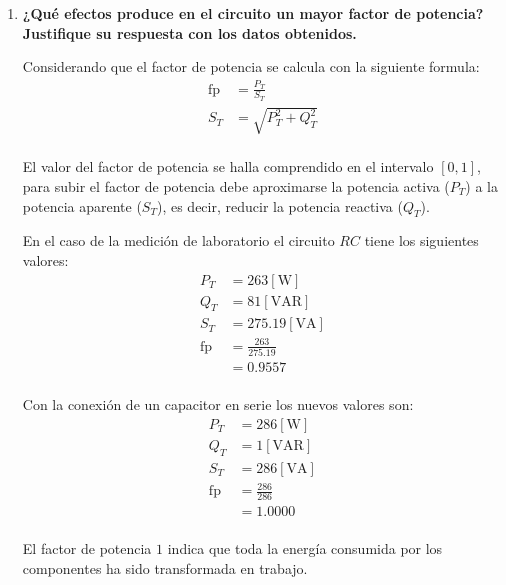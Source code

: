 \documentclass[letter,11pt]{article}
\begin{document}
\begin{enumerate}

\item \textbf{¿Qué efectos produce en el circuito un mayor factor de potencia?
Justifique su respuesta con los datos obtenidos.}

Considerando que el factor de potencia se calcula con la siguiente formula:
\begin{equation*}
    \begin{split}
        \text{fp} &= \frac{P_T}{S_T}\\
        S_T &= \sqrt{P_T^2 + Q_T^2}\\
    \end{split}
\end{equation*}

El valor del factor de potencia se halla comprendido en el intervalo $[0,1]$,
para subir el factor de potencia debe aproximarse la potencia activa ($P_T$) a
la potencia aparente ($S_T$), es decir, reducir la potencia reactiva ($Q_T$).

En el caso de la medición de laboratorio el circuito $RC$ tiene los siguientes
valores:
\begin{equation*}
    \begin{split}
        P_T &= 263[\text{W}]\\
        Q_T &= 81[\text{VAR}]\\
        S_T &= 275.19[\text{VA}]\\
        \text{fp} &= \frac{263}{275.19}\\
                  &= 0.9557\\
    \end{split}
\end{equation*}

Con la conexión de un capacitor en serie los nuevos valores son:
\begin{equation*}
    \begin{split}
        P_T &= 286[\text{W}]\\
        Q_T &= 1[\text{VAR}]\\
        S_T &= 286[\text{VA}]\\
        \text{fp} &= \frac{286}{286}\\
                  &= 1.0000\\
    \end{split}
\end{equation*}

El factor de potencia $1$ indica que toda la energía consumida por los
componentes ha sido transformada en trabajo.


\end{enumerate}
\end{document}
